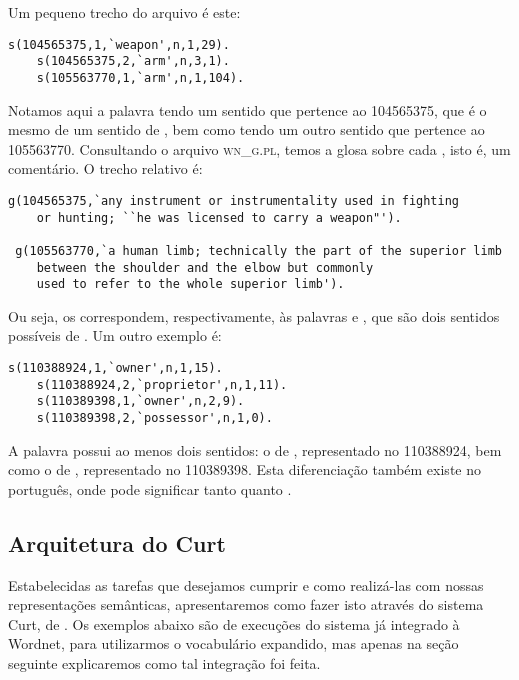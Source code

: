 			Um pequeno trecho do arquivo é este:
		
		\begin{Verbatim}[fontseries=b,gobble=1]
	s(104565375,1,`weapon',n,1,29).
	s(104565375,2,`arm',n,3,1).
	s(105563770,1,`arm',n,1,104).
		\end{Verbatim}	
		
		Notamos aqui a palavra  tendo um sentido que pertence ao  104565375, que é o mesmo de um sentido de , bem como tendo um outro sentido que pertence ao  105563770. Consultando o arquivo \textsc{wn\_g.pl}, temos a glosa sobre cada , isto é, um comentário. O trecho relativo é:
		
		\begin{Verbatim}[fontseries=b,gobble=1]
 g(104565375,`any instrument or instrumentality used in fighting
	or hunting; ``he was licensed to carry a weapon"').

 g(105563770,`a human limb; technically the part of the superior limb
	between the shoulder and the elbow but commonly
	used to refer to the whole superior limb').
		\end{Verbatim}
		
		Ou seja, os  correspondem, respectivamente, às palavras  e , que são dois sentidos possíveis de . Um outro exemplo é:
		
		\begin{Verbatim}[fontseries=b,gobble=1]
	s(110388924,1,`owner',n,1,15).
	s(110388924,2,`proprietor',n,1,11).
	s(110389398,1,`owner',n,2,9).
	s(110389398,2,`possessor',n,1,0).
		\end{Verbatim}
		
		A palavra  possui ao menos dois sentidos: o de , representado no  110388924, bem como o de , representado no  110389398. Esta diferenciação também existe no português, onde  pode significar tanto  quanto .
	

\subsection{Arquitetura do Curt}

	Estabelecidas as tarefas que desejamos cumprir e como realizá-las com nossas representações semânticas, apresentaremos como fazer isto através do sistema Curt, de \citet{BlackburnBos:2005}. Os exemplos abaixo são de execuções do sistema já integrado à Wordnet, para utilizarmos o vocabulário expandido, mas apenas na seção seguinte explicaremos como tal integração foi feita. \update
	
